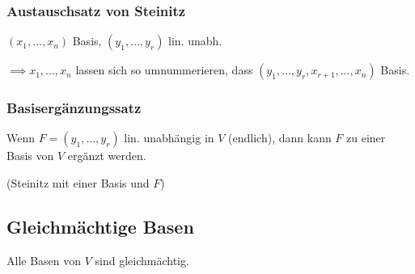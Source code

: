 \subsubsection*{Austauschsatz von Steinitz}
$(x_1,\dots,x_n)$ Basis, $(y_1,\dots,y_r)$ lin. unabh.

$\implies x_1,\dots,x_n$ lassen sich so umnummerieren,
dass $(y_1,\dots,y_r,x_{r+1},\dots,x_n)$ Basis.

\subsubsection*{Basisergänzungssatz}
Wenn $F=(y_1,\dots,y_r)$ lin. unabhängig in $V$ (endlich),
dann kann $F$ zu einer Basis von $V$ ergänzt werden.

(Steinitz mit einer Basis und $F$)

\subsection*{Gleichmächtige Basen}
Alle Basen von $V$ sind gleichmächtig.
